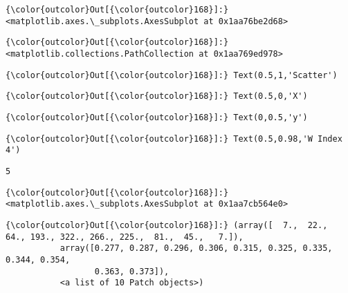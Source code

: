 \documentclass[11pt]{article}
\begin{document}
\begin{Verbatim}[commandchars=\\\{\}]
{\color{outcolor}Out[{\color{outcolor}168}]:} <matplotlib.axes.\_subplots.AxesSubplot at 0x1aa76be2d68>
\end{Verbatim}
            
\begin{Verbatim}[commandchars=\\\{\}]
{\color{outcolor}Out[{\color{outcolor}168}]:} <matplotlib.collections.PathCollection at 0x1aa769ed978>
\end{Verbatim}
            
\begin{Verbatim}[commandchars=\\\{\}]
{\color{outcolor}Out[{\color{outcolor}168}]:} Text(0.5,1,'Scatter')
\end{Verbatim}
            
\begin{Verbatim}[commandchars=\\\{\}]
{\color{outcolor}Out[{\color{outcolor}168}]:} Text(0.5,0,'X')
\end{Verbatim}
            
\begin{Verbatim}[commandchars=\\\{\}]
{\color{outcolor}Out[{\color{outcolor}168}]:} Text(0,0.5,'y')
\end{Verbatim}
            
\begin{Verbatim}[commandchars=\\\{\}]
{\color{outcolor}Out[{\color{outcolor}168}]:} Text(0.5,0.98,'W Index 4')
\end{Verbatim}
            
    \begin{Verbatim}[commandchars=\\\{\}]
5

    \end{Verbatim}

\begin{Verbatim}[commandchars=\\\{\}]
{\color{outcolor}Out[{\color{outcolor}168}]:} <matplotlib.axes.\_subplots.AxesSubplot at 0x1aa7cb564e0>
\end{Verbatim}
            
\begin{Verbatim}[commandchars=\\\{\}]
{\color{outcolor}Out[{\color{outcolor}168}]:} (array([  7.,  22.,  64., 193., 322., 266., 225.,  81.,  45.,   7.]),
           array([0.277, 0.287, 0.296, 0.306, 0.315, 0.325, 0.335, 0.344, 0.354,
                  0.363, 0.373]),
           <a list of 10 Patch objects>)
\end{Verbatim}
            
\end{document}
